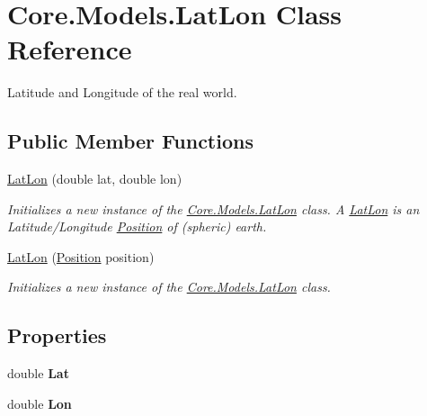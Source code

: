 \hypertarget{classCore_1_1Models_1_1LatLon}{\section{Core.\-Models.\-Lat\-Lon Class Reference}
\label{classCore_1_1Models_1_1LatLon}
}


Latitude and Longitude of the real world.  


\subsection*{Public Member Functions}
\begin{DoxyCompactItemize}
\item 
\hyperlink{classCore_1_1Models_1_1LatLon_a5f0b81d9ee32d5df7001076a186db0ba}{Lat\-Lon} (double lat, double lon)
\begin{DoxyCompactList}\small\item\em Initializes a new instance of the \hyperlink{classCore_1_1Models_1_1LatLon}{Core.\-Models.\-Lat\-Lon} class. A \hyperlink{classCore_1_1Models_1_1LatLon}{Lat\-Lon} is an Latitude/\-Longitude \hyperlink{classCore_1_1Models_1_1Position}{Position} of (spheric) earth. \end{DoxyCompactList}\item 
\hyperlink{classCore_1_1Models_1_1LatLon_a61ef0fd0335e0942d600ef80b7f0fcce}{Lat\-Lon} (\hyperlink{classCore_1_1Models_1_1Position}{Position} position)
\begin{DoxyCompactList}\small\item\em Initializes a new instance of the \hyperlink{classCore_1_1Models_1_1LatLon}{Core.\-Models.\-Lat\-Lon} class. \end{DoxyCompactList}\end{DoxyCompactItemize}
\subsection*{Properties}
\begin{DoxyCompactItemize}
\item 
\hypertarget{classCore_1_1Models_1_1LatLon_a3b195e6b2a2f11d19ff283e921343638}{double {\bfseries Lat}}\label{classCore_1_1Models_1_1LatLon_a3b195e6b2a2f11d19ff283e921343638}

\item 
\hypertarget{classCore_1_1Models_1_1LatLon_af16c7196d72b996c3b7f593f9ea174f1}{double {\bfseries Lon}}\label{classCore_1_1Models_1_1LatLon_af16c7196d72b996c3b7f593f9ea174f1}

\end{DoxyCompactItemize}


